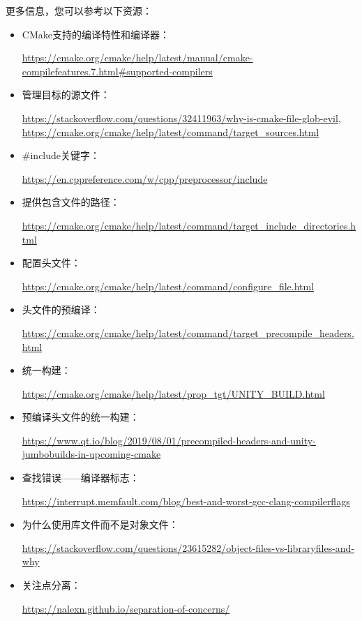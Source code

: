 更多信息，您可以参考以下资源：

\begin{itemize}
\item
CMake支持的编译特性和编译器：

\url{https://cmake.org/cmake/help/latest/manual/cmake-compilefeatures.7.html#supported-compilers}

\item
管理目标的源文件：

\url{https://stackoverflow.com/questions/32411963/why-is-cmake-file-glob-evil}, \url{https://cmake.org/cmake/help/latest/command/target_sources.html}

\item
\#include关键字：

\url{https://en.cppreference.com/w/cpp/preprocessor/include}

\item
提供包含文件的路径：

\url{https://cmake.org/cmake/help/latest/command/target_include_directories.html}

\item
配置头文件：

\url{https://cmake.org/cmake/help/latest/command/configure_file.html}

\item
头文件的预编译：

\url{https://cmake.org/cmake/help/latest/command/target_precompile_headers.html}

\item
统一构建：

\url{https://cmake.org/cmake/help/latest/prop_tgt/UNITY_BUILD.html}

\item
预编译头文件的统一构建：

\url{https://www.qt.io/blog/2019/08/01/precompiled-headers-and-unity-jumbobuilds-in-upcoming-cmake}

\item
查找错误——编译器标志：

\url{https://interrupt.memfault.com/blog/best-and-worst-gcc-clang-compilerflags}

\item
为什么使用库文件而不是对象文件：

\url{https://stackoverflow.com/questions/23615282/object-files-vs-libraryfiles-and-why}

\item
关注点分离：

\url{https://nalexn.github.io/separation-of-concerns/}
\end{itemize}